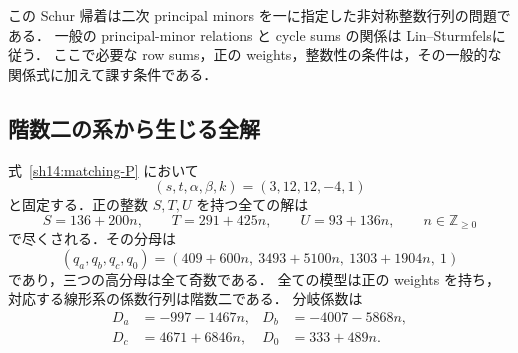 この Schur 帰着は二次 principal minors を一に指定した非対称整数行列の問題である．
一般の principal-minor relations と cycle sums の関係は Lin--Sturmfels\cite[\S2, Proposition~4]{LinSturmfels}に従う．
ここで必要な row sums，正の weights，整数性の条件は，その一般的な関係式に加えて課す条件である．

\subsection{階数二の系から生じる全解}

\begin{theorem}
\label{sh14:singular-family}
式~\eqref{sh14:matching-P} において
\[
 (s,t,\alpha,\beta,k)=(3,12,12,-4,1)
\]
と固定する．正の整数 $S,T,U$ を持つ全ての解は
\begin{equation}\label{sh14:singular-parameters}
 S=136+200n,\qquad T=291+425n,\qquad U=93+136n,
 \qquad n\in\mathbb Z_{\geq0}
\end{equation}
で尽くされる．その分母は
\begin{equation}\label{sh14:singular-q}
 (q_a,q_b,q_c,q_0)
 =(409+600n,\ 3493+5100n,\ 1303+1904n,\ 1)
\end{equation}
であり，三つの高分母は全て奇数である．
全ての模型は正の weights を持ち，対応する線形系の係数行列は階数二である．
分岐係数は
\begin{align*}
 D_a&=-997-1467n,&D_b&=-4007-5868n,\\
 D_c&=4671+6846n,&D_0&=333+489n.
\end{align*}
\end{theorem}

